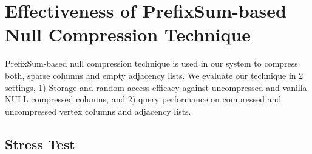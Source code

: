 \section{Effectiveness of PrefixSum-based Null Compression Technique}
\label{exp:prefixSum}

PrefixSum-based null compression technique is used in our system to compress both, sparse columns and empty adjacency lists. We evaluate our technique in 2 settings, 1) Storage and random access efficacy against uncompressed and vanilla NULL compressed columns, and 2) query performance on compressed and uncompressed vertex columns and adjacency lists.

\subsection{Stress Test} 

